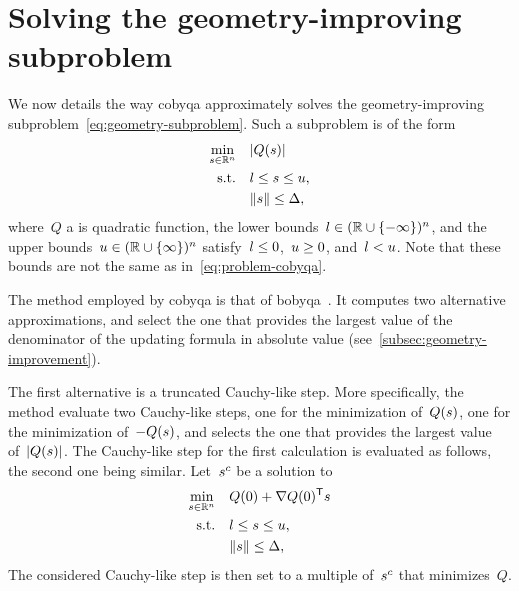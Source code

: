 
\section{Solving the geometry-improving subproblem}
\label{sec:cobyqa-geometry-improving}

We now details the way \gls{cobyqa} approximately solves the geometry-improving subproblem~\cref{eq:geometry-subproblem}.
Such a subproblem is of the form
\begin{subequations}
    \label{eq:geometry-simple}
    \begin{align}
        \min_{\sstep \in \R^n}  & \quad \abs{Q(\sstep)}\\
        \text{s.t.}             & \quad \xl \le \sstep \le \xu,\\
                                & \quad \norm{\sstep} \le \rad,
    \end{align}
\end{subequations}
where~$Q$ a is quadratic function, the lower bounds~$l \in (\mathbb{R} \cup \{-\infty\})^n$, and the upper bounds~$u \in (\mathbb{R} \cup \{\infty\})^n$ satisfy~$l \le 0$,~$u \ge 0$, and~$l < u$.
Note that these bounds are not the same as in~\cref{eq:problem-cobyqa}.

The method employed by \gls{cobyqa} is that of \gls{bobyqa}~\cite{Powell_2009}.
It computes two alternative approximations, and select the one that provides the largest value of the denominator of the updating formula in absolute value (see~\cref{subsec:geometry-improvement}).

The first alternative is a truncated Cauchy-like step.
More specifically, the method evaluate two Cauchy-like steps, one for the minimization of~$Q(\sstep)$, one for the minimization of~$-Q(\sstep)$, and selects the one that provides the largest value of~$\abs{Q(\sstep)}$.
The Cauchy-like step for the first calculation is evaluated as follows, the second one being similar.
Let~$\sstep[c]$ be a solution to
\begin{align*}
    \min_{\sstep \in \R^n}  & \quad Q(0) + \nabla Q(0)^{\T} \sstep\\
    \text{s.t.}             & \quad \xl \le \sstep \le \xu,\\
                            & \quad \norm{\sstep} \le \rad,
\end{align*}
The considered Cauchy-like step is then set to a multiple of~$\sstep[c]$ that minimizes~$Q$.

